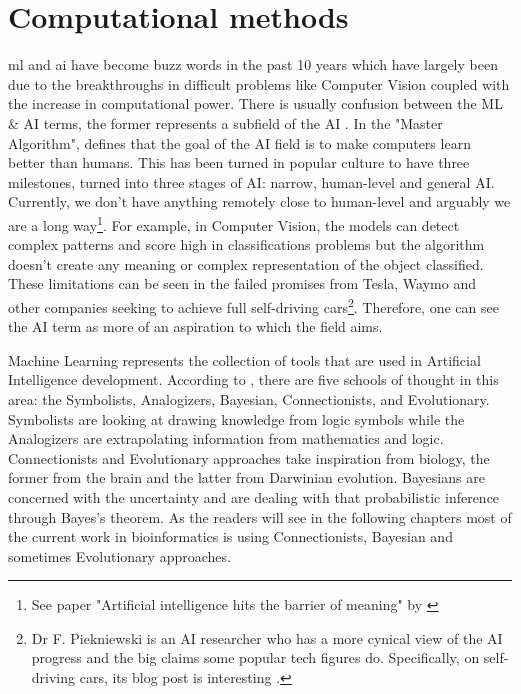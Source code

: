 \section{Computational methods} \label{s:computational}


\acrfull{ml} and \acrfull{ai} have become buzz words in the past 10 years which have largely been due to the breakthroughs in difficult problems like Computer Vision\cite{Krizhevsky2012-qa} coupled with the increase in computational power. There is usually confusion between the ML \& AI terms, the former represents a subfield of the AI \cite{Domingos_Pedro2015-xr}. In the "Master Algorithm", \citet{Domingos_Pedro2015-xr} defines that the goal of the AI field is to make computers learn better than humans. This has been turned in popular culture to have three milestones, turned into three stages of AI: narrow, human-level and general AI. Currently, we don't have anything remotely close to human-level and arguably we are a long way\footnote{See paper "Artificial intelligence hits the barrier of meaning" by \citet{Mitchell2019-hv}}. For example, in Computer Vision, the models can detect complex patterns and score high in classifications problems but the algorithm doesn't create any meaning or complex representation of the object classified. These limitations can be seen in the failed promises from Tesla, Waymo and other companies seeking to achieve full self-driving cars\footnote{Dr F. Piekniewski is an AI researcher who has a more cynical view of the AI progress and the big claims some popular tech figures do. Specifically, on self-driving cars, its blog post is interesting \cite{Piekniewski2021-if}.}. Therefore, one can see the AI term as more of an aspiration to which the field aims.

Machine Learning represents the collection of tools that are used in Artificial Intelligence development. According to \citet{Domingos_Pedro2015-xr}, there are five schools of thought in this area: the Symbolists, Analogizers, Bayesian, Connectionists, and Evolutionary. Symbolists are looking at drawing knowledge from logic symbols while the Analogizers are extrapolating information from mathematics and logic\cite{Domingos_Pedro2015-xr}. Connectionists and Evolutionary approaches take inspiration from biology, the former from the brain and the latter from Darwinian evolution. Bayesians are concerned with the uncertainty and are dealing with that probabilistic inference through Bayes's theorem\cite{Domingos_Pedro2015-xr}. As the readers will see in the following chapters most of the current work in bioinformatics is using Connectionists, Bayesian and sometimes Evolutionary approaches.

